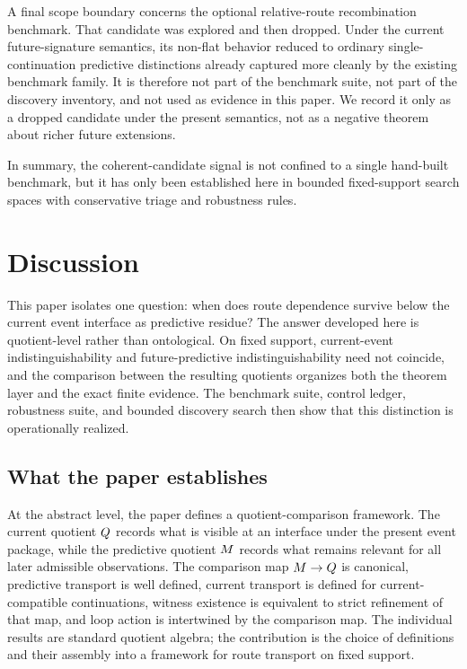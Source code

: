 \documentclass[11pt]{article}
\theoremstyle{definition}
\begin{document}
A final scope boundary concerns the optional relative-route recombination benchmark. That candidate was explored and then dropped. Under the current future-signature semantics, its non-flat behavior reduced to ordinary single-continuation predictive distinctions already captured more cleanly by the existing benchmark family. It is therefore not part of the benchmark suite, not part of the discovery inventory, and not used as evidence in this paper. We record it only as a dropped candidate under the present semantics, not as a negative theorem about richer future extensions.

In summary, the coherent-candidate signal is not confined to a single hand-built benchmark, but it has only been established here in bounded fixed-support search spaces with conservative triage and robustness rules.

\section{Discussion}\label{sec:discussion}
This paper isolates one question: when does route dependence survive below the current event interface as predictive residue? The answer developed here is quotient-level rather than ontological. On fixed support, current-event indistinguishability and future-predictive indistinguishability need not coincide, and the comparison between the resulting quotients organizes both the theorem layer and the exact finite evidence. The benchmark suite, control ledger, robustness suite, and bounded discovery search then show that this distinction is operationally realized.

\subsection{What the paper establishes}\label{subsec:discussion-established}
At the abstract level, the paper defines a quotient-comparison framework. The current quotient $Q$ records what is visible at an interface under the present event package, while the predictive quotient $M$ records what remains relevant for all later admissible observations. The comparison map $M \to Q$ is canonical, predictive transport is well defined, current transport is defined for current-compatible continuations, witness existence is equivalent to strict refinement of that map, and loop action is intertwined by the comparison map. The individual results are standard quotient algebra; the contribution is the choice of definitions and their assembly into a framework for route transport on fixed support.
\end{document}
